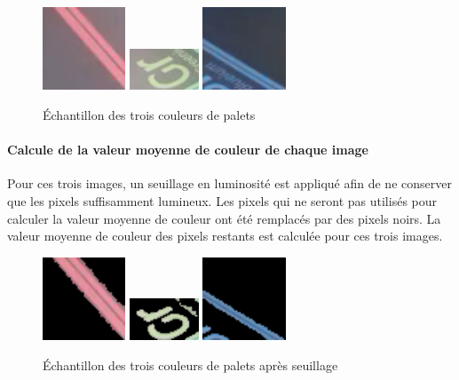 \documentclass{article}
\begin{document}
\begin{figure}[!h]
\begin{center}
\includegraphics[height=70pt]{rouge_init.png}
\includegraphics[height=35pt]{vert_init.png}
\includegraphics[height=70pt]{bleu_init.png}
\end{center}
\caption{Échantillon des trois couleurs de palets}
\label{couleurs}
\end{figure}

\paragraph{Calcule de la valeur moyenne de couleur de chaque image}
Pour ces trois images, un seuillage en luminosité est appliqué afin de ne conserver que les pixels suffisamment lumineux.
Les pixels qui ne seront pas utilisés pour calculer la valeur moyenne de couleur ont été remplacés par des pixels noirs.
La valeur moyenne de couleur des pixels restants est calculée pour ces trois images.
\begin{figure}[!h]
\begin{center}
\includegraphics[height=70pt]{rouge_seuillee.png}
\includegraphics[height=35pt]{vert_seuillee.png}
\includegraphics[height=70pt]{bleu_seuillee.png}
\end{center}
\caption{Échantillon des trois couleurs de palets après seuillage}
\label{couleurs_seuillee}
\end{figure}
\end{document}
